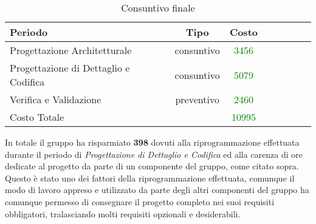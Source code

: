 \begin{table}[h]
	\centering
	\begin{tabular}{|l|c|c|c|c|c|c|c|}
		\toprule
		\textbf{Periodo} & \textbf{Tipo} & \textbf{Costo} \\
		
		\midrule
		Progettazione Architetturale & consuntivo & \textcolor{green}{3456} \\
		Progettazione di Dettaglio e Codifica & consuntivo & \textcolor{green}{5079} \\ 
		Verifica e Validazione & preventivo & \textcolor{green}{2460} \\
		
		\midrule
		Costo Totale & & \textcolor{green}{10995} \\
				
		\bottomrule
	\end{tabular}
	\caption{Consuntivo finale}
\end{table}

\noindent In totale il gruppo ha risparmiato \textbf{398} dovuti alla riprogrammazione effettuata durante il periodo di \textit{Progettazione di Dettaglio e Codifica} ed alla carenza di ore dedicate al progetto da parte di un componente del gruppo, come citato sopra. Questo è stato uno dei fattori della riprogrammazione effettuata, comunque il modo di lavoro appreso e utilizzato da parte degli altri componenti del gruppo ha comunque permesso di consegnare il progetto completo nei suoi requisiti obbligatori, tralasciando molti requisiti opzionali e desiderabili.